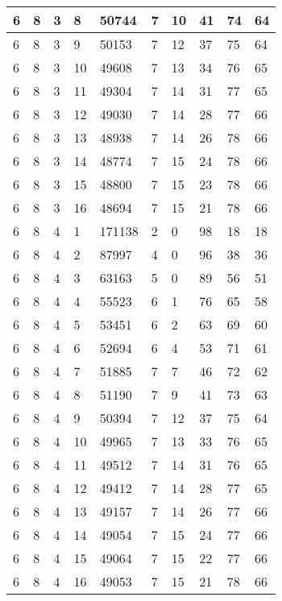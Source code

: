 \begin{table}[!ht]
\begin{tabular}{|l|l|l|l|l|l|l|l|l|l|}
        6 & 8 & 3 & 8 & 50744 & 7 & 10 & 41 & 74 & 64 \\ \hline
        6 & 8 & 3 & 9 & 50153 & 7 & 12 & 37 & 75 & 64 \\ \hline
        6 & 8 & 3 & 10 & 49608 & 7 & 13 & 34 & 76 & 65 \\ \hline
        6 & 8 & 3 & 11 & 49304 & 7 & 14 & 31 & 77 & 65 \\ \hline
        6 & 8 & 3 & 12 & 49030 & 7 & 14 & 28 & 77 & 66 \\ \hline
        6 & 8 & 3 & 13 & 48938 & 7 & 14 & 26 & 78 & 66 \\ \hline
        6 & 8 & 3 & 14 & 48774 & 7 & 15 & 24 & 78 & 66 \\ \hline
        6 & 8 & 3 & 15 & 48800 & 7 & 15 & 23 & 78 & 66 \\ \hline
        6 & 8 & 3 & 16 & 48694 & 7 & 15 & 21 & 78 & 66 \\ \hline
        6 & 8 & 4 & 1 & 171138 & 2 & 0 & 98 & 18 & 18 \\ \hline
        6 & 8 & 4 & 2 & 87997 & 4 & 0 & 96 & 38 & 36 \\ \hline
        6 & 8 & 4 & 3 & 63163 & 5 & 0 & 89 & 56 & 51 \\ \hline
        6 & 8 & 4 & 4 & 55523 & 6 & 1 & 76 & 65 & 58 \\ \hline
        6 & 8 & 4 & 5 & 53451 & 6 & 2 & 63 & 69 & 60 \\ \hline
        6 & 8 & 4 & 6 & 52694 & 6 & 4 & 53 & 71 & 61 \\ \hline
        6 & 8 & 4 & 7 & 51885 & 7 & 7 & 46 & 72 & 62 \\ \hline
        6 & 8 & 4 & 8 & 51190 & 7 & 9 & 41 & 73 & 63 \\ \hline
        6 & 8 & 4 & 9 & 50394 & 7 & 12 & 37 & 75 & 64 \\ \hline
        6 & 8 & 4 & 10 & 49965 & 7 & 13 & 33 & 76 & 65 \\ \hline
        6 & 8 & 4 & 11 & 49512 & 7 & 14 & 31 & 76 & 65 \\ \hline
        6 & 8 & 4 & 12 & 49412 & 7 & 14 & 28 & 77 & 65 \\ \hline
        6 & 8 & 4 & 13 & 49157 & 7 & 14 & 26 & 77 & 66 \\ \hline
        6 & 8 & 4 & 14 & 49054 & 7 & 15 & 24 & 77 & 66 \\ \hline
        6 & 8 & 4 & 15 & 49064 & 7 & 15 & 22 & 77 & 66 \\ \hline
        6 & 8 & 4 & 16 & 49053 & 7 & 15 & 21 & 78 & 66 \\ \hline

\end{tabular}
\end{table}
